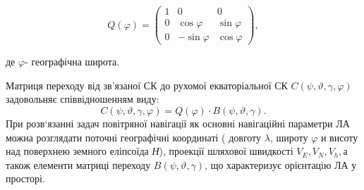 \[Q\left(\varphi \right)=\left(\begin{array}{ccc} {1} & {0} & {0} \\ 
{0} & {\cos\varphi } & {\sin \varphi } \\ 
{0} & {-\sin \varphi } & {\cos \varphi } \end{array}\right),\] 

де $\varphi $- географічна широта.

Матриця переходу від зв'язаної СК до рухомої екваторіальної СК $C(\psi ,\vartheta,\gamma ,\varphi)$ 
задовольняє співвідношенням виду:
\[C\left(\psi ,\vartheta ,\gamma ,\varphi \right)=
Q\left(\varphi \right)\cdot B\left(\psi ,\vartheta ,\gamma \right).\] 
При розв`язанні задач повітряної навігації як основні навігаційні параметри ЛА можна 
розглядати поточні географічні координаті ( довготу $\lambda $, широту $\varphi $ и 
висоту над поверхнею земного еліпсоїда \textit{Н}), проекції шляхової швидкості $V_{E} 
,V_{N} ,V_{h} ,$а також елементи матриці переходу $B\left(\psi ,\vartheta ,\gamma 
\right)$, що характеризує орієнтацію ЛА у просторі.

